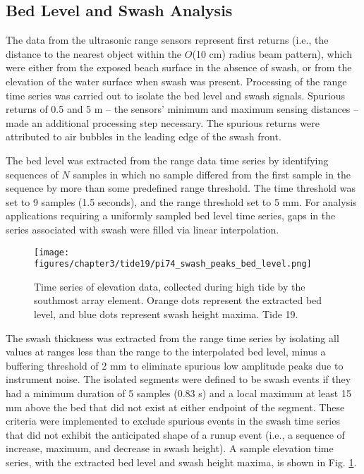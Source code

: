 \subsection{Bed Level and Swash Analysis}

The data from the ultrasonic range sensors represent first returns (i.e., the distance to the nearest object within the $O$(10 cm) radius beam pattern), which were either from the exposed beach surface in the absence of swash, or from the elevation of the water surface when swash was present. Processing of the range time series was carried out to isolate the bed level and swash signals. Spurious returns of 0.5 and 5 m -- the sensors' minimum and maximum sensing distances -- made an additional processing step necessary. The spurious returns were attributed to air bubbles in the leading edge of the swash front. 

The bed level was extracted from the range data time series by identifying sequences of $N$ samples in which no sample differed from the first sample in the sequence by more than some predefined range threshold. The time threshold was set to 9 samples (1.5 seconds), and the range threshold set to 5 mm. For analysis applications requiring a uniformly sampled bed level time series, gaps in the series associated with swash were filled via linear interpolation. 

\begin{figure}[tbp] %
  	\texttt{[image: figures/chapter3/tide19/pi74\_swash\_peaks\_bed\_level.png]}
 	\caption[Bed level and swash height time series]{Time series of elevation data, collected during high tide by the southmost array element. Orange dots represent the extracted bed level, and blue dots represent swash height maxima. Tide 19. \label{fig:swash_peaks}}
\end{figure}

The swash thickness was extracted from the range time series by isolating all values at ranges less than the range to the interpolated bed level, minus a buffering threshold of 2 mm to eliminate spurious low amplitude peaks due to instrument noise. The isolated segments were defined to be swash events if they had a minimum duration of 5 samples (0.83 s) and a local maximum at least 15 mm above the bed that did not exist at either endpoint of the segment. These criteria were implemented to exclude spurious events in the swash time series that did not exhibit the anticipated shape of a runup event (i.e., a sequence of increase, maximum, and decrease in swash height). A sample elevation time series, with the extracted bed level and swash height maxima, is shown in Fig. \ref{fig:swash_peaks}.

